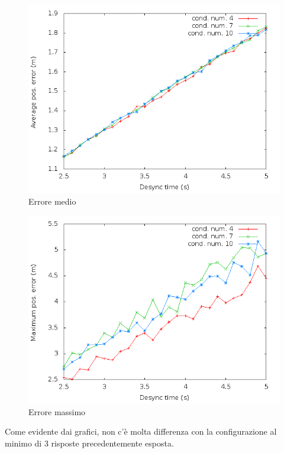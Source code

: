\documentclass[Lau,binding=0.6cm]{sapthesis}
\begin{document}
\begin{figure}[H]
    \centering
    \includegraphics[scale=0.5]{octagonsimulation/avposerrorreq4preempt1drop1speed1.png}
    \caption{Errore medio}
    \label{fig:octagonsimulation/avposerrorreq4preempt1drop1speed1}
\end{figure}
\begin{figure}[H]
    \centering
    \includegraphics[scale=0.5]{octagonsimulation/maxposerrorreq4preempt1drop1speed1.png}
    \caption{Errore massimo}
    \label{fig:octagonsimulation/avposerrorreq4preempt1drop1speed1}
\end{figure}
Come evidente dai grafici, non c'è molta differenza con la configurazione al minimo di 3 risposte precedentemente esposta.
\end{document}

